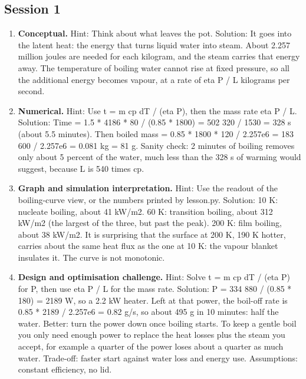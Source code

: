 \documentclass[11pt,a4paper]{article}
\begin{document}
\subsection*{Session 1}
\begin{enumerate}[nosep]
\item \textbf{Conceptual.} Hint: Think about what leaves the pot. Solution: It goes into the latent heat: the energy that turns liquid water into steam. About 2.257 million joules are needed for each kilogram, and the steam carries that energy away. The temperature of boiling water cannot rise at fixed pressure, so all the additional energy becomes vapour, at a rate of eta P / L kilograms per second.
\item \textbf{Numerical.} Hint: Use t = m cp dT / (eta P), then the mass rate eta P / L. Solution: Time = 1.5 * 4186 * 80 / (0.85 * 1800) = 502 320 / 1530 = 328 s (about 5.5 minutes). Then boiled mass = 0.85 * 1800 * 120 / 2.257e6 = 183 600 / 2.257e6 = 0.081 kg = 81 g. Sanity check: 2 minutes of boiling removes only about 5 percent of the water, much less than the 328 s of warming would suggest, because L is 540 times cp.
\item \textbf{Graph and simulation interpretation.} Hint: Use the readout of the boiling-curve view, or the numbers printed by lesson.py. Solution: 10 K: nucleate boiling, about 41 kW/m2. 60 K: transition boiling, about 312 kW/m2 (the largest of the three, but past the peak). 200 K: film boiling, about 38 kW/m2. It is surprising that the surface at 200 K, 190 K hotter, carries about the same heat flux as the one at 10 K: the vapour blanket insulates it. The curve is not monotonic.
\item \textbf{Design and optimisation challenge.} Hint: Solve t = m cp dT / (eta P) for P, then use eta P / L for the mass rate. Solution: P = 334 880 / (0.85 * 180) = 2189 W, so a 2.2 kW heater. Left at that power, the boil-off rate is 0.85 * 2189 / 2.257e6 = 0.82 g/s, so about 495 g in 10 minutes: half the water. Better: turn the power down once boiling starts. To keep a gentle boil you only need enough power to replace the heat losses plus the steam you accept, for example a quarter of the power loses about a quarter as much water. Trade-off: faster start against water loss and energy use. Assumptions: constant efficiency, no lid.
\end{enumerate}
\end{document}
